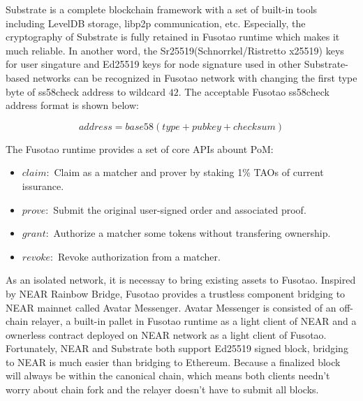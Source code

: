 \documentclass[a4paper,12pt]{article}
\begin{document}
Substrate is a complete blockchain framework with a set of built-in tools including LevelDB storage, libp2p communication, etc. Especially, the cryptography of Substrate is fully retained in Fusotao runtime which makes it much reliable. In another word, the Sr25519(Schnorrkel/Ristretto x25519) keys for user singature and Ed25519 keys for node signature used in other Substrate-based networks can be recognized in Fusotao network with changing the first type byte of ss58check address to wildcard \(42\). The acceptable Fusotao ss58check address format is shown below:

\begin{equation*}
address = base58(type+pubkey+checksum)
\end{equation*}

The Fusotao runtime provides a set of core APIs abount PoM:
\begin{itemize}
    \item $claim:$ Claim as a matcher and prover by staking 1\% TAOs of current issurance.
    \item $prove:$ Submit the original user-signed order and associated proof.
    \item $grant:$ Authorize a matcher some tokens without transfering ownership.
    \item $revoke:$ Revoke authorization from a matcher.
\end{itemize}

As an isolated network, it is necessay to bring existing assets to Fusotao. Inspired by NEAR Rainbow Bridge, Fusotao provides a trustless component bridging to NEAR mainnet called Avatar Messenger. Avatar Messenger is consisted of an off-chain relayer, a built-in pallet in Fusotao runtime as a light client of NEAR and a ownerless contract deployed on NEAR network as a light client of Fusotao. Fortunately, NEAR and Substrate both support Ed25519 signed block, bridging to NEAR is much easier than bridging to Ethereum. Because a finalized block will always be within the canonical chain, which means both clients needn't worry about chain fork and the relayer doesn't have to submit all blocks.
\end{document}
